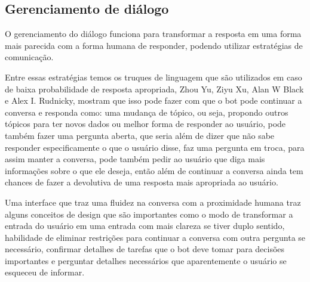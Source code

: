 \documentclass[
	12pt,				%
	oneside,
	a4paper,			%
	english,			%
	french,				%
	spanish,			%
	brazil				%
	]{abntex2}
\begin{document}
\subsection{Gerenciamento de diálogo}
O gerenciamento do diálogo funciona para transformar a resposta em uma forma mais parecida com a forma humana de responder, podendo utilizar estratégias de comunicação.

Entre essas estratégias temos os truques de linguagem que são utilizados em caso de baixa probabilidade de resposta apropriada, Zhou Yu, Ziyu Xu, Alan W Black e Alex I. Rudnicky, mostram que isso pode fazer com que o bot pode continuar a conversa e responda como: uma mudança de tópico, ou seja, propondo outros tópicos para ter novos dados ou melhor forma de responder ao usuário, pode também fazer uma pergunta aberta, que seria além de dizer que não sabe responder especificamente o que o usuário disse, faz uma pergunta em troca, para assim manter a conversa, pode também pedir ao usuário que diga mais informações sobre o que ele deseja, então além de continuar a conversa ainda tem chances de fazer a devolutiva de uma resposta mais apropriada ao usuário.

Uma interface que traz uma fluidez na conversa com a proximidade humana traz alguns conceitos de design que são importantes como o modo de transformar a entrada do usuário em uma entrada com mais clareza se tiver duplo sentido, habilidade de eliminar restrições para continuar a conversa com outra pergunta se necessário, confirmar detalhes  de tarefas que o bot deve tomar para decisões importantes e perguntar detalhes necessários que aparentemente o usuário se esqueceu de informar.


\end{document}
